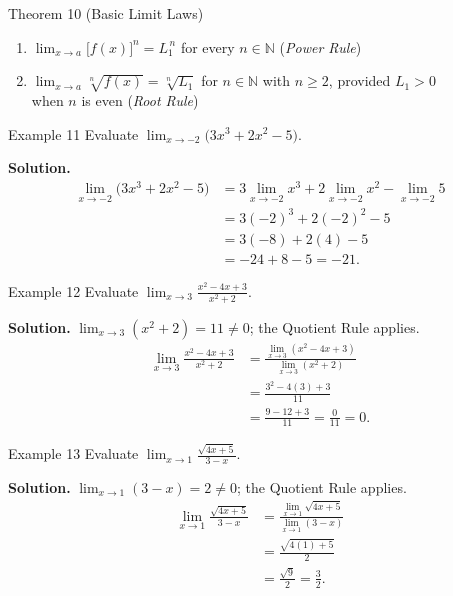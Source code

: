 \begin{theorembox}{Theorem 10 (Basic Limit Laws)}
\begin{enumerate}
\begin{enumerate}
        \item[(e)] \(\displaystyle\lim_{x \to a} \bigl[f(x)\bigr]^{n} = L_{1}^{\,n}\) for every \(n \in \mathbb{N}\)
            \hfill (\textit{Power Rule})

        \item[(f)] \(\displaystyle\lim_{x \to a} \sqrt[n]{f(x)} = \sqrt[n]{L_{1}}\)
            for \(n \in \mathbb{N}\) with \(n \geq 2\), provided \(L_{1} > 0\)\\ when \(n\) is even
            \hfill (\textit{Root Rule})
    \end{enumerate}
\end{enumerate}
\end{theorembox}

\begin{examplebox}{Example 11}
Evaluate \(\displaystyle\lim_{x \to -2} \bigl(3x^{3} + 2x^{2} - 5\bigr)\).

\medskip
\textbf{Solution.}
\begin{align*}
\lim_{x \to -2} \bigl(3x^{3} + 2x^{2} - 5\bigr)
&= 3\lim_{x \to -2} x^{3} + 2\lim_{x \to -2} x^{2} - \lim_{x \to -2} 5
   \tag{4(a),(b)} \\[6pt]
&= 3(-2)^{3} + 2(-2)^{2} - 5
   \tag{Laws 2,3; 4(e)} \\[6pt]
&= 3(-8) + 2(4) - 5 \\[6pt]
&= -24 + 8 - 5 = -21.
\end{align*}
\end{examplebox}

\begin{examplebox}{Example 12}
Evaluate \(\displaystyle\lim_{x \to 3} \frac{x^{2} - 4x + 3}{x^{2} + 2}\).

\medskip
\textbf{Solution.} \(\displaystyle\lim_{x \to 3} (x^{2} + 2) = 11 \neq 0\); the Quotient Rule applies.
\begin{align*}
\lim_{x \to 3} \frac{x^{2} - 4x + 3}{x^{2} + 2}
&= \frac{\displaystyle\lim_{x \to 3} (x^{2} - 4x + 3)}
        {\displaystyle\lim_{x \to 3} (x^{2} + 2)}
   \tag{4(d)} \\[8pt]
&= \frac{3^{2} - 4(3) + 3}{11}
   \tag{4(a),(b),(e); Laws 2,3} \\[6pt]
&= \frac{9 - 12 + 3}{11}
   = \frac{0}{11}
   = 0.
\end{align*}
\end{examplebox}

\begin{examplebox}{Example 13}
Evaluate \(\displaystyle\lim_{x \to 1} \frac{\sqrt{4x + 5}}{\,3 - x\,}\).

\medskip
\textbf{Solution.} \(\displaystyle\lim_{x \to 1} (3 - x) = 2 \neq 0\); the Quotient Rule applies.
\begin{align*}
\lim_{x \to 1} \frac{\sqrt{4x + 5}}{3 - x}
&= \frac{\displaystyle\lim_{x \to 1} \sqrt{4x + 5}}
        {\displaystyle\lim_{x \to 1} (3 - x)}
   \tag{4(d)} \\[8pt]
&= \frac{\sqrt{4(1) + 5}}{2}
   \tag{4(f); Laws 2,3} \\[6pt]
&= \frac{\sqrt{9}}{2}
   = \frac{3}{2}.
\end{align*}
\end{examplebox}

